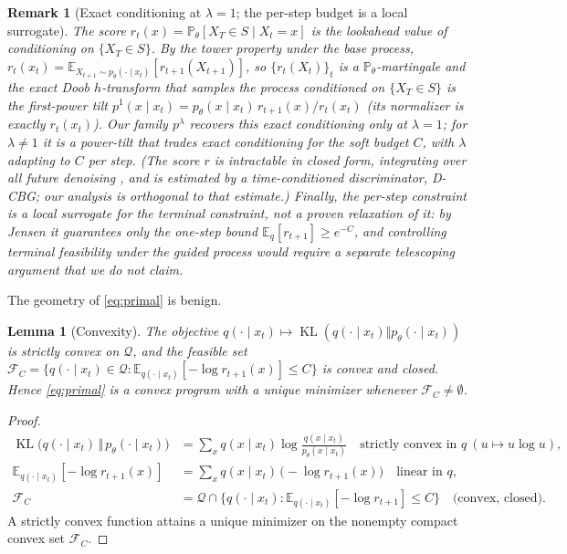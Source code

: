 \documentclass{article}
\newtheorem{lemma}{Lemma}
\newtheorem{remark}{Remark}
\DeclareMathOperator{\KL}{KL}
\newcommand{\E}{\mathbb{E}}
\newcommand{\Q}{\mathcal{Q}}
\begin{document}
\begin{remark}[Exact conditioning at $\lambda{=}1$; the per-step budget is a local surrogate]
\label{rmk:myopic}
The score $r_t(x)=\mathbb P_\theta[X_T\in S\mid X_t=x]$ is the \emph{lookahead value} of conditioning on $\{X_T\in S\}$. By the tower property under the base process, $r_t(x_t)=\E_{X_{t+1}\sim p_\theta(\cdot\mid x_t)}[r_{t+1}(X_{t+1})]$, so $\{r_t(X_t)\}_t$ is a $\mathbb P_\theta$-martingale and the exact Doob $h$-transform that samples the process conditioned on $\{X_T\in S\}$ is the \emph{first-power} tilt $p^{1}(x\mid x_t)=p_\theta(x\mid x_t)\,r_{t+1}(x)/r_t(x_t)$ (its normalizer is exactly $r_t(x_t)$). Our family $p^{\lambda}$ recovers this exact conditioning \emph{only} at $\lambda=1$; for $\lambda\neq1$ it is a power-tilt that trades exact conditioning for the soft budget $C$, with $\lambda$ adapting to $C$ per step. (The score $r$ is intractable in closed form, integrating over all future denoising \cite{wu2023practical,zhao2024probabilistic}, and is estimated by a time-conditioned discriminator, D-CBG; our analysis is orthogonal to that estimate.) Finally, the per-step constraint is a \emph{local surrogate} for the terminal constraint, not a proven relaxation of it: by Jensen it guarantees only the one-step bound $\E_{q}[r_{t+1}]\ge e^{-C}$, and controlling terminal feasibility under the \emph{guided} process would require a separate telescoping argument that we do not claim.
\end{remark}

The geometry of \eqref{eq:primal} is benign.

\begin{lemma}[Convexity]
\label{lem:convex}
The objective $q(\cdot\mid x_t)\mapsto\KL(q(\cdot\mid x_t)\Vert p_\theta(\cdot\mid x_t))$ is strictly convex on $\Q$, and the feasible set
$\mathcal{F}_C=\{q(\cdot\mid x_t)\in\Q:\E_{q(\cdot\mid x_t)}[-\log r_{t+1}(x)]\le C\}$ is convex and closed. Hence \eqref{eq:primal} is a convex program with a unique minimizer whenever $\mathcal{F}_C\neq\emptyset$.
\end{lemma}
\begin{proof}
\begin{align*}
\KL\big(q(\cdot\mid x_t)\,\Vert\,p_\theta(\cdot\mid x_t)\big)
  &=\sum_x q(x\mid x_t)\log\frac{q(x\mid x_t)}{p_\theta(x\mid x_t)}
   \quad\text{strictly convex in }q\ (u\mapsto u\log u),\\
\E_{q(\cdot\mid x_t)}[-\log r_{t+1}(x)]
  &=\sum_x q(x\mid x_t)\,\big(-\log r_{t+1}(x)\big)
   \quad\text{linear in }q,\\
\mathcal{F}_C
  &=\Q\cap\big\{q(\cdot\mid x_t):\E_{q(\cdot\mid x_t)}[-\log r_{t+1}]\le C\big\}
   \quad\text{(convex, closed)}.
\end{align*}
A strictly convex function attains a unique minimizer on the nonempty compact convex set $\mathcal{F}_C$.
\end{proof}
\end{document}
